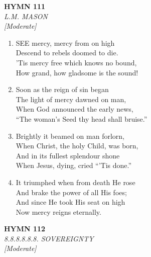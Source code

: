 \documentclass[11pt,a4paper]{article}
\begin{document}
\newpage
\begin{center}
    {\Large \textbf{HYMN 111}}
    \\
    \textit{L.M. MASON}
    \\
    \textit{\small [Moderate]}
\end{center}
\vspace{1em}

\begin{enumerate}
    \item SEE mercy, mercy from on high \\
        Descend to rebels doomed to die. \\
        'Tis mercy free which knows no bound, \\
        How grand, how gladsome is the sound!

    \item Soon as the reign of sin began \\
        The light of mercy dawned on man, \\
        When God announced the early news, \\
        ``The woman's Seed thy head shall bruise.''

    \item Brightly it beamed on man forlorn, \\
        When Christ, the holy Child, was born, \\
        And in its fullest splendour shone \\
        When Jesus, dying, cried ``'Tis done.''

    \item It triumphed when from death He rose \\
        And brake the power of all His foes; \\
        And since He took His seat on high \\
        Now mercy reigns eternally.

\end{enumerate}

\newpage
\begin{center}
    {\Large \textbf{HYMN 112}}
    \\
    \textit{8.8.8.8.8.8. SOVEREIGNTY}
    \\
    \textit{\small [Moderate]}
\end{center}
\vspace{1em}
\end{document}
